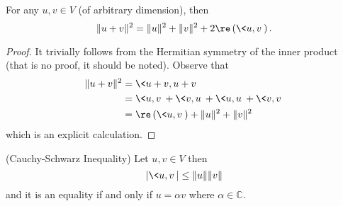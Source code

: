\begin{lem}
For any $u,v\in V$ (of arbitrary dimension), then
\begin{equation}
\|u+v\|^2 = \|u\|^2 + \|v\|^2 + 2\re\left(\<u,v\>\right).
\end{equation}
\end{lem}
\begin{proof}
It trivially follows from the Hermitian symmetry of the
inner product (that is no proof, it should be
noted). Observe that
\begin{subequations}
\begin{align}
\|u+v\|^2 &= \<u+v,u+v\> \\
&= \<u,v\>+\<v,u\>+\<u,u\>+\<v,v\> \\
&=\re\left(\<u,v\>\right)+\|u\|^2+\|v\|^2
\end{align}
\end{subequations}
which is an explicit calculation.
\end{proof}
\begin{lem}{(Cauchy-Schwarz Inequality)}
Let $u,v\in V$ then
\begin{equation}
|\<u,v\>|\leq\|u\|\|v\|
\end{equation}
and it is an equality if and only if $u=\alpha v$ where
$\alpha\in\mathbb{C}$.
\end{lem}
